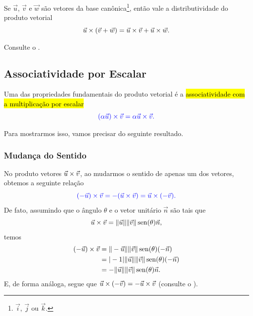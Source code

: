 \begin{proposicao}
  Se $\vec{u}$, $\vec{v}$ e $\vec{w}$ são vetores da base canônica\footnote{$\vec{i}$, $\vec{j}$ ou $\vec{k}$.}, então vale a distributividade do produto vetorial
  \begin{equation}
    \vec{u}\times(\vec{v}+\vec{w}) = \vec{u}\times\vec{v}+\vec{u}\times\vec{w}.
  \end{equation}
\end{proposicao}
\begin{demonstracao}
  Consulte o .
\end{demonstracao}

\subsection{Associatividade por Escalar}

Uma das propriedades fundamentais do produto vetorial é a \hl{associatividade com a multiplicação por escalar}
\begin{equation}\label{cap_produtos_sec_cross:eq:associatividade_por_escalar}
  \color{blue}(\alpha\vec{u})\times\vec{v} = \alpha \vec{u}\times\vec{v}.
\end{equation}

Para mostrarmos isso, vamos precisar do seguinte resultado.

\subsubsection{Mudança do Sentido}\label{cap_produtos_sec_cross:sssec:mudanca_de_sentido}

No produto vetores $\vec{u}\times \vec{v}$, ao mudarmos o sentido de apenas um dos vetores, obtemos a seguinte relação
\begin{equation}\label{cap_produtos_sec_cross:eq:mudanca_do_sentido}
  \color{blue}(-\vec{u})\times\vec{v} = -(\vec{u}\times\vec{v}) = \vec{u}\times(-\vec{v}).
\end{equation}
De fato, assumindo que o ângulo $\theta$ e o vetor unitário $\vec{n}$ são tais que
\begin{equation}
  \vec{u}\times\vec{v} = \|\vec{u}\|\|\vec{v}\|\operatorname{sen}(\theta)\vec{n},
\end{equation}
temos
\begin{align}
  (-\vec{u})\times\vec{v} &= \|-\vec{u}\|\|\vec{v}\|\operatorname{sen}(\theta)(-\vec{n})\\
  &= |-1|\|\vec{u}\|\|\vec{v}\|\operatorname{sen}(\theta)(-\vec{n})\\
  &= -\|\vec{u}\|\|\vec{v}\|\operatorname{sen}(\theta)\vec{n}.
\end{align}
E, de forma análoga, segue que $\vec{u}\times(-\vec{v}) = -\vec{u}\times\vec{v}$ (consulte o ).


